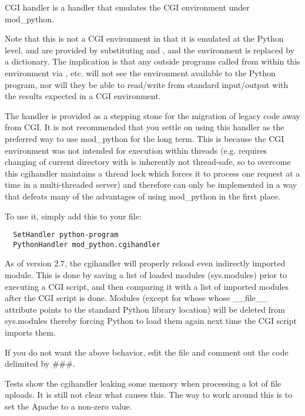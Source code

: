 
CGI handler is a handler that emulates the CGI environment under mod_python. 

Note that this is not a  CGI environment in that it is
emulated at the Python level.  and  are
provided by substituting  and , and
the environment is replaced by a dictionary. The implication is that
any outside programs called from within this environment via
, etc. will not see the environment available to the
Python program, nor will they be able to read/write from standard
input/output with the results expected in a  CGI environment.

The handler is provided as a stepping stone for the migration of
legacy code away from CGI. It is not recommended that you settle on
using this handler as the preferred way to use mod_python for the long
term. This is because the CGI environment was not intended for
execution within threads (e.g. requires changing of current directory
with is inherently not thread-safe, so to overcome this cgihandler
maintains a thread lock which forces it to process one request at a
time in a multi-threaded server) and therefore can only be implemented
in a way that defeats many of the advantages of using mod_python in
the first place.

To use it, simply add this to your  file: 

\begin{verbatim}
  SetHandler python-program
  PythonHandler mod_python.cgihandler
\end{verbatim}

As of version 2.7, the cgihandler will properly reload even indirectly
imported module. This is done by saving a list of loaded modules
(sys.modules) prior to executing a CGI script, and then comparing it
with a list of imported modules after the CGI script is done.  Modules
(except for whose whose __file__ attribute points to the standard
Python library location) will be deleted from sys.modules thereby
forcing Python to load them again next time the CGI script imports
them.

If you do not want the above behavior, edit the 
file and comment out the code delimited by \#\#\#.

Tests show the cgihandler leaking some memory when processing a lot of
file uploads. It is still not clear what causes this. The way to work
around this is to set the Apache  to a non-zero
value.


